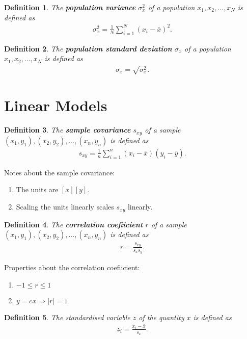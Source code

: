 \documentclass{article}
\theoremstyle{sltheorem}
\newtheorem{definition}{Definition}[section]
\newcommand*\B[1]{\textbf{#1}}
\begin{document}
\begin{definition}
	The \B{population variance} $\sigma_x^2$ of a population $x_1, x_2, ..., x_N$ is defined as
	\begin{align*}
		\sigma_x^2 =\frac{1}{N}\sum_{i=1}^N (x_i-\bar x)^2.
	\end{align*}
\end{definition}
\begin{definition}
	The \B{population standard deviation} $\sigma_x$ of a population $x_1, x_2, ..., x_N$ is defined as
	\begin{align*}
		\sigma_x = \sqrt{\sigma_x^2}.
	\end{align*}
\end{definition}
\section{Linear Models}
\begin{definition}
	The \B{sample covariance} $s_{xy}$ of a sample $(x_1, y_1), (x_2, y_2), ..., (x_n, y_n)$
	is defined as
	\begin{align*}
		s_{xy} = \frac{1}{n}\sum_{i=1}^n (x_i - \bar x)(y_i - \bar y).
	\end{align*}
\end{definition}
Notes about the sample covariance:
\begin{enumerate}
	\item The units are $[x][y]$.
	\item Scaling the units linearly scales $s_{xy}$ linearly.
\end{enumerate}
\begin{definition}
	The \B{correlation coefiicient} $r$ of a sample $(x_1, y_1), (x_2, y_2), ..., (x_n, y_n)$ is defined as
	\begin{align*}
		r = \frac{s_{xy}}{s_x s_y}.
	\end{align*}
\end{definition}
Properties about the correlation coefiicient:
\begin{enumerate}
	\item $-1 \leq r \leq 1$
	\item $y=cx \Rightarrow |r|=1$
\end{enumerate}
\begin{definition}
	The standardised variable $z$ of the quantity $x$ is defined as
	\begin{align*}
		z_i = \frac{x_i-\bar x}{s_x}.
	\end{align*}
\end{definition}
\end{document}

